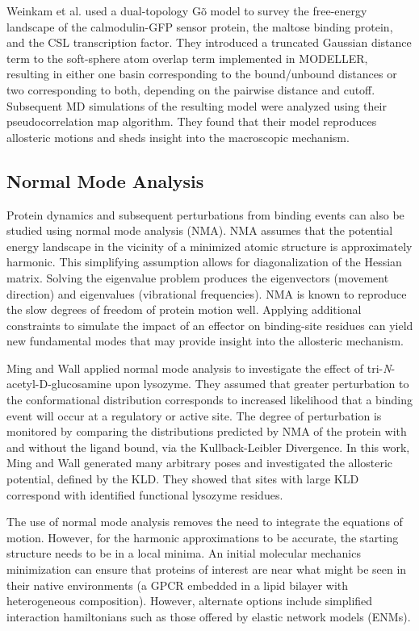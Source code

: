 \par Weinkam et al. used a dual-topology G\~{o} model\cite{Go1984a} to survey the free-energy landscape of the calmodulin-GFP  sensor protein, the maltose binding protein, and the CSL transcription factor. They introduced a truncated Gaussian distance term to the soft-sphere atom overlap term implemented in MODELLER,\cite{Sali1993a,Marti-Renom2000a,Fiser2000a,Eswar2007a} resulting in either one basin corresponding to the bound/unbound distances or two corresponding to both, depending on the pairwise distance and cutoff. Subsequent MD simulations of the resulting model were analyzed using their pseudocorrelation map algorithm.\cite{Weinkam2012a} They found that their model reproduces allosteric motions and sheds insight into the macroscopic mechanism.
\subsection{Normal Mode Analysis}
\par Protein dynamics and subsequent perturbations from binding events can also be studied using normal mode analysis (NMA).\cite{Bahar2005a,Zheng2006a,Zheng2009c} NMA assumes that the potential energy landscape in the vicinity of a minimized atomic structure is approximately harmonic. This simplifying assumption allows for diagonalization of the Hessian matrix. Solving the eigenvalue problem produces the eigenvectors (movement direction) and eigenvalues (vibrational frequencies). NMA is known to reproduce the slow degrees of freedom of protein motion well.\cite{Ma2005a,Bahar2005a} Applying additional constraints to simulate the impact of an effector on binding-site residues can yield new fundamental modes that may provide insight into the allosteric mechanism.
\par Ming and Wall applied normal mode analysis to investigate the effect of tri-\textit{N}-acetyl-\textsc{D}-glucosamine upon lysozyme.\cite{Ming2005c} They assumed that greater perturbation to the conformational distribution corresponds to increased likelihood that a binding event will occur at a regulatory or active site. The degree of perturbation is monitored by comparing the distributions predicted by NMA of the protein with and without the ligand bound, via the Kullback-Leibler Divergence. In this work, Ming and Wall generated many arbitrary poses and investigated the allosteric potential, defined by the KLD. They showed that sites with large KLD correspond with identified functional lysozyme residues.
\par The use of normal mode analysis removes the need to integrate the equations of motion. However, for the harmonic approximations to be accurate, the starting structure needs to be in a local minima. An initial molecular mechanics minimization can ensure that proteins of interest are near what might be seen in their native environments (\eg a GPCR embedded in a lipid bilayer with heterogeneous composition). However, alternate options include simplified interaction hamiltonians such as those offered by elastic network models (ENMs).
